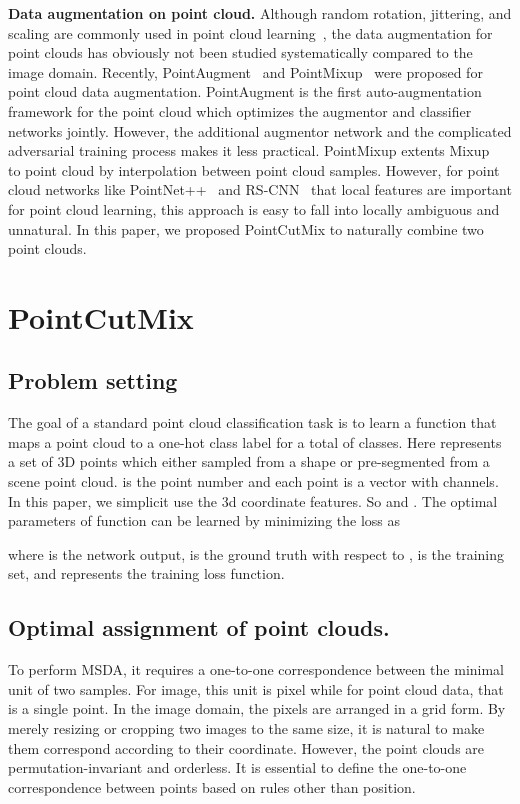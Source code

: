 \documentclass{article}
\begin{document}
\textbf{Data augmentation on point cloud.} 
Although random rotation, jittering, and scaling are commonly used in point cloud learning~\cite{pointnet,pointnet++}, the data augmentation for point clouds has obviously not been studied systematically compared to the image domain. 
Recently, PointAugment~\cite{pointaugment} and PointMixup~\cite{pointmixup} were proposed for point cloud data augmentation. PointAugment is the first auto-augmentation framework for the point cloud which optimizes the augmentor and classifier networks jointly. However, the additional augmentor network and the complicated adversarial training process makes it less practical. PointMixup extents Mixup~\cite{mixup} to point cloud by interpolation between point cloud samples. However, for point cloud networks like PointNet++~\cite{pointnet++} and RS-CNN~\cite{rscnn} that local features are important for point cloud learning, this approach is easy to fall into locally ambiguous and unnatural. In this paper, we proposed PointCutMix to naturally combine two point clouds.



\section{PointCutMix}

\subsection{Problem setting}

The goal of a standard point cloud classification task is to learn a function  that maps a point cloud to a one-hot class label for a total of  classes. Here  represents a set of 3D points  which either sampled from a shape or pre-segmented from a scene point cloud.  is the point number and each point  is a vector with  channels. In this paper, we simplicit use the 3d coordinate features. So  and . 
The optimal parameters  of function  can be learned by minimizing the loss as

where  is the network output,  is the ground truth with respect to ,  is the training set, and  represents the training loss function.



\subsection{Optimal assignment of point clouds.} 
To perform MSDA, it requires a one-to-one correspondence between the minimal unit of two samples. For image, this unit is pixel while for point cloud data, that is a single point. In the image domain, the pixels are arranged in a grid form. By merely resizing or cropping two images to the same size, it is natural to make them correspond according to their coordinate. However, the point clouds are permutation-invariant and orderless. It is essential to define the one-to-one correspondence between points based on rules other than position.
\end{document}
